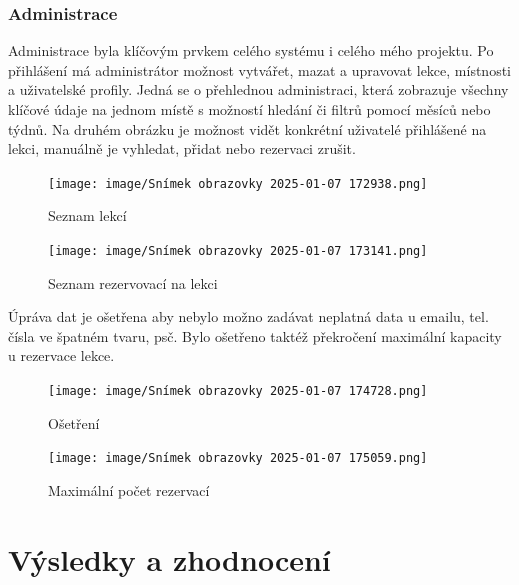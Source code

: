 \documentclass[12pt, a4paper,
openright
]{report}
\begin{document}
    \subsection{Administrace}
    Administrace byla klíčovým prvkem celého systému i celého mého projektu.
    Po přihlášení má administrátor možnost vytvářet, mazat a upravovat lekce, místnosti a uživatelské profily.
    Jedná se o přehlednou administraci, která zobrazuje všechny klíčové údaje na jednom místě s možností hledání či filtrů pomocí měsíců nebo týdnů. Na druhém obrázku je možnost vidět konkrétní uživatelé přihlášené na lekci, manuálně je vyhledat, přidat nebo rezervaci zrušit.
    
    \begin{figure}[h]
    \centering
    \begin{minipage}{0.45\textwidth}
        \centering
        \texttt{[image: image/Snímek obrazovky 2025-01-07 172938.png]}
        \caption{Seznam lekcí}
        \label{fig:image1}
    \end{minipage}
    \hfill
    \begin{minipage}{0.45\textwidth}
        \centering
        \texttt{[image: image/Snímek obrazovky 2025-01-07 173141.png]}
        \caption{Seznam rezervovací na lekci}
        \label{fig:image2}
    \end{minipage}
    \end{figure}
    \clearpage
        Úpráva dat je ošetřena aby nebylo možno zadávat neplatná data u emailu, tel. čísla ve špatném tvaru, psč. Bylo ošetřeno taktéž překročení maximální kapacity u rezervace lekce.
        \begin{figure}[h!]
            \centering
            \texttt{[image: image/Snímek obrazovky 2025-01-07 174728.png]}
            \caption{Ošetření}
            \label{fig:enter-label}
        \end{figure}
\begin{figure}[h!]
    \centering
    \texttt{[image: image/Snímek obrazovky 2025-01-07 175059.png]}
    \caption{Maximální počet rezervací}
    \label{fig:enter-label}
\end{figure}



\chapter{Výsledky a zhodnocení}
\end{document}
